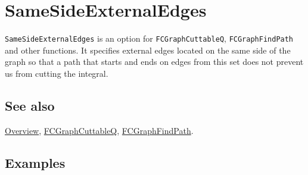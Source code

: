 \documentclass[../FeynCalcManual.tex]{subfiles}
\begin{document}
\hypertarget{samesideexternaledges}{
\section{SameSideExternalEdges}\label{samesideexternaledges}}

\texttt{SameSideExternalEdges} is an option for
\texttt{FCGraphCuttableQ}, \texttt{FCGraphFindPath} and other functions.
It specifies external edges located on the same side of the graph so
that a path that starts and ends on edges from this set does not prevent
us from cutting the integral.

\subsection{See also}

\hyperlink{toc}{Overview},
\hyperlink{fcgraphcuttableq}{FCGraphCuttableQ},
\hyperlink{fcgraphfindpath}{FCGraphFindPath}.

\subsection{Examples}
\end{document}
